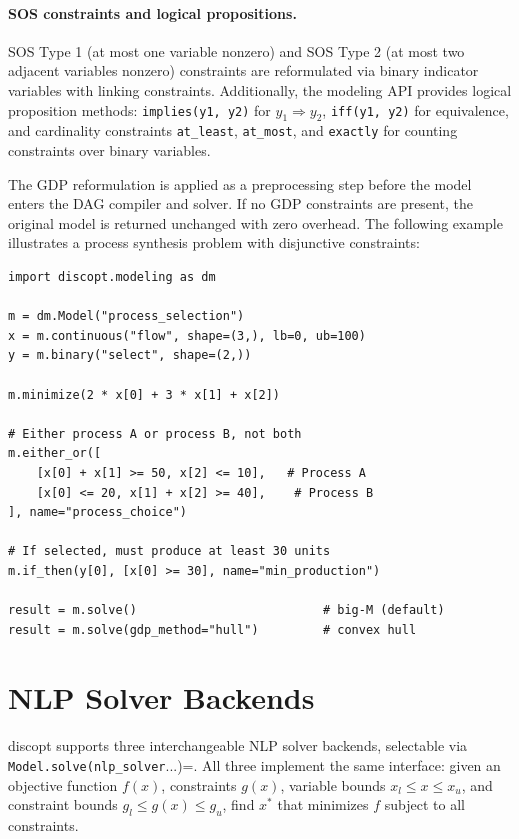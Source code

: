 \documentclass[12pt,preprint]{article}
\begin{document}
\paragraph{SOS constraints and logical propositions.}
SOS Type 1 (at most one variable nonzero) and SOS Type 2 (at most two adjacent variables nonzero) constraints \cite{Beale1970} are reformulated via binary indicator variables with linking constraints. Additionally, the modeling API provides logical proposition methods: \texttt{implies(y1, y2)} for $y_1 \Rightarrow y_2$, \texttt{iff(y1, y2)} for equivalence, and cardinality constraints \texttt{at\_least}, \texttt{at\_most}, and \texttt{exactly} for counting constraints over binary variables.

The GDP reformulation is applied as a preprocessing step before the model enters the DAG compiler and solver. If no GDP constraints are present, the original model is returned unchanged with zero overhead. The following example illustrates a process synthesis problem with disjunctive constraints:

\begin{verbatim}
import discopt.modeling as dm

m = dm.Model("process_selection")
x = m.continuous("flow", shape=(3,), lb=0, ub=100)
y = m.binary("select", shape=(2,))

m.minimize(2 * x[0] + 3 * x[1] + x[2])

# Either process A or process B, not both
m.either_or([
    [x[0] + x[1] >= 50, x[2] <= 10],   # Process A
    [x[0] <= 20, x[1] + x[2] >= 40],    # Process B
], name="process_choice")

# If selected, must produce at least 30 units
m.if_then(y[0], [x[0] >= 30], name="min_production")

result = m.solve()                          # big-M (default)
result = m.solve(gdp_method="hull")         # convex hull
\end{verbatim}


\section{NLP Solver Backends}
\label{org-nlp-solver-backends}
discopt supports three interchangeable NLP solver backends, selectable via \texttt{Model.solve(nlp\_solver}...)=. All three implement the same interface: given an objective function $f(x)$, constraints $g(x)$, variable bounds $x_l \le x \le x_u$, and constraint bounds $g_l \le g(x) \le g_u$, find $x^*$ that minimizes $f$ subject to all constraints.
\end{document}
